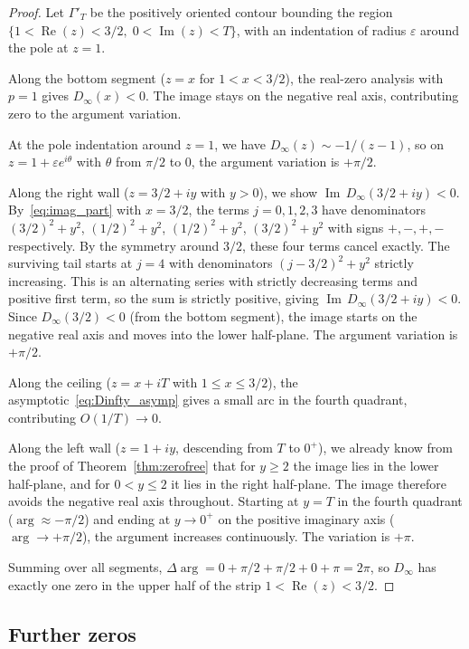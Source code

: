 \documentclass[11pt]{amsart}
\theoremstyle{definition}
\theoremstyle{remark}
\newcommand{\eps}{\varepsilon}
\newcommand{\Real}{\operatorname{Re}}
\newcommand{\Imag}{\operatorname{Im}}
\begin{document}
\begin{proof}
Let $\Gamma'_T$ be the positively oriented contour bounding the region $\{1 < \Real(z) < 3/2,\; 0 < \Imag(z) < T\}$, with an indentation of radius $\eps$ around the pole at $z = 1$.

Along the bottom segment ($z = x$ for $1 < x < 3/2$), the real-zero analysis with $p = 1$ gives $D_\infty(x) < 0$. The image stays on the negative real axis, contributing zero to the argument variation.

At the pole indentation around $z = 1$, we have $D_\infty(z) \sim -1/(z-1)$, so on $z = 1 + \eps e^{i\theta}$ with $\theta$ from $\pi/2$ to $0$, the argument variation is $+\pi/2$.

Along the right wall ($z = 3/2 + iy$ with $y > 0$), we show $\Imag\, D_\infty(3/2+iy) < 0$. By~\eqref{eq:imag_part} with $x = 3/2$, the terms $j = 0,1,2,3$ have denominators $(3/2)^2+y^2$, $(1/2)^2+y^2$, $(1/2)^2+y^2$, $(3/2)^2+y^2$ with signs $+,-,+,-$ respectively. By the symmetry around $3/2$, these four terms cancel exactly. The surviving tail starts at $j = 4$ with denominators $(j-3/2)^2 + y^2$ strictly increasing. This is an alternating series with strictly decreasing terms and positive first term, so the sum is strictly positive, giving $\Imag\, D_\infty(3/2+iy) < 0$. Since $D_\infty(3/2) < 0$ (from the bottom segment), the image starts on the negative real axis and moves into the lower half-plane. The argument variation is $+\pi/2$.

Along the ceiling ($z = x + iT$ with $1 \leq x \leq 3/2$), the asymptotic~\eqref{eq:Dinfty_asymp} gives a small arc in the fourth quadrant, contributing $O(1/T) \to 0$.

Along the left wall ($z = 1 + iy$, descending from $T$ to $0^+$), we already know from the proof of Theorem~\ref{thm:zerofree} that for $y \geq 2$ the image lies in the lower half-plane, and for $0 < y \leq 2$ it lies in the right half-plane. The image therefore avoids the negative real axis throughout. Starting at $y = T$ in the fourth quadrant ($\arg \approx -\pi/2$) and ending at $y \to 0^+$ on the positive imaginary axis ($\arg \to +\pi/2$), the argument increases continuously. The variation is $+\pi$.

Summing over all segments, $\Delta\arg = 0 + \pi/2 + \pi/2 + 0 + \pi = 2\pi$, so $D_\infty$ has exactly one zero in the upper half of the strip $1 < \Real(z) < 3/2$.
\end{proof}


\subsection{Further zeros}
\end{document}

